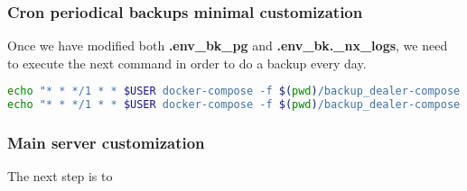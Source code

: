 \subsubsection[Cron periodical backups minimal customization]{Cron periodical backups minimal customization}
\begin{flushleft}
    Once we have modified both \textbf{.env\_bk\_pg} and \textbf{.env\_bk.\_nx\_logs}, we need to execute the next command in order to do
    a backup every day.
    \begin{lstlisting}[language=bash,label={lst:insert_to_cron}]
echo "* * */1 * * $USER docker-compose -f $(pwd)/backup_dealer-compose.yml --env-file $(pwd)/bkcli_env_folder/.env_bk_pg up"
echo "* * */1 * * $USER docker-compose -f $(pwd)/backup_dealer-compose.yml --env-file $(pwd)/bkcli_env_folder/.env_bk_ng_logs up"
    \end{lstlisting}
\end{flushleft}

\subsubsection[Backups server deployment minimal customization]{Main server customization}
\begin{flushleft}
    The next step is to
    
\end{flushleft}


